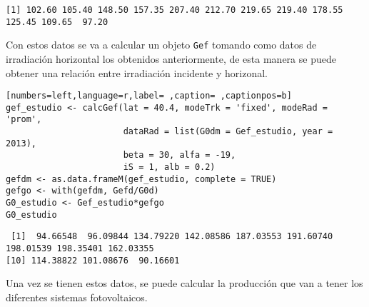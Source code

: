 \begin{verbatim}
[1] 102.60 105.40 148.50 157.35 207.40 212.70 219.65 219.40 178.55 125.45 109.65  97.20
\end{verbatim}


Con estos datos se va a calcular un objeto \texttt{Gef} tomando como datos de irradiación horizontal los obtenidos anteriormente, de esta manera se puede obtener una relación entre irradiación incidente y horizonal.
\begin{lstlisting}[numbers=left,language=r,label= ,caption= ,captionpos=b]
gef_estudio <- calcGef(lat = 40.4, modeTrk = 'fixed', modeRad = 'prom',
                       dataRad = list(G0dm = Gef_estudio, year = 2013),
                       beta = 30, alfa = -19,
                       iS = 1, alb = 0.2)
gefdm <- as.data.frameM(gef_estudio, complete = TRUE)
gefgo <- with(gefdm, Gefd/G0d)
G0_estudio <- Gef_estudio*gefgo
G0_estudio
\end{lstlisting}

\begin{verbatim}
 [1]  94.66548  96.09844 134.79220 142.08586 187.03553 191.60740 198.01539 198.35401 162.03355
[10] 114.38822 101.08676  90.16601
\end{verbatim}


Una vez se tienen estos datos, se puede calcular la producción que van a tener los diferentes sistemas fotovoltaicos.

